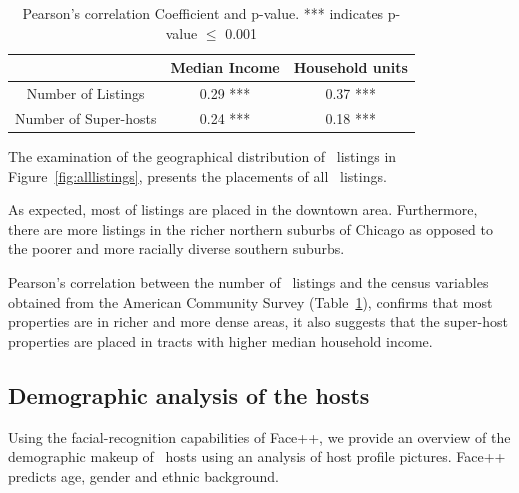 \begin{table}[htp] 
\begin{center}
\begin{tabular}{c|c|c}
& Median  Income & Household units \\
\hline
\hline
Number of Listings &  0.29 *** & 0.37 ***\\
\hline
Number of Super-hosts &  0.24 ***& 0.18 ***\\
\hline
\end{tabular}
\end{center}
\caption{Pearson's correlation Coefficient and p-value. *** indicates p-value $\leqslant$ 0.001}
\label{tab:pre}
\end{table}%



The examination of the geographical distribution of \ab \ listings in Figure~\ref{fig:alllistings}, presents the placements of all \ab \  listings.

As expected, most of listings are placed in the downtown area.
Furthermore, there are more listings in the richer northern suburbs of Chicago as opposed to the poorer and more racially diverse southern suburbs.

Pearson's correlation between the number of \ab \ listings and the census variables obtained from the American Community Survey (Table~\ref{tab:pre}), confirms that most properties are in richer and more dense areas, it also suggests that the super-host properties are placed in tracts with higher median household income.



\subsection{Demographic analysis of the hosts}

Using the facial-recognition capabilities of Face++, we provide an overview of the demographic makeup of \ab \ hosts using an analysis of host profile pictures. Face++ predicts age, gender and ethnic background.

